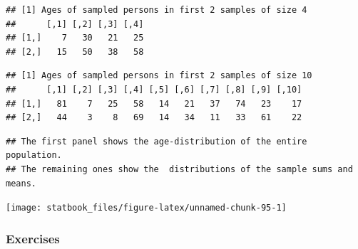 \documentclass[]{book}
\begin{document}
\begin{verbatim}
## [1] Ages of sampled persons in first 2 samples of size 4
##      [,1] [,2] [,3] [,4]
## [1,]    7   30   21   25
## [2,]   15   50   38   58
\end{verbatim}

\begin{verbatim}
## [1] Ages of sampled persons in first 2 samples of size 10
##      [,1] [,2] [,3] [,4] [,5] [,6] [,7] [,8] [,9] [,10]
## [1,]   81    7   25   58   14   21   37   74   23    17
## [2,]   44    3    8   69   14   34   11   33   61    22
\end{verbatim}

\begin{verbatim}
## The first panel shows the age-distribution of the entire population.
## The remaining ones show the  distributions of the sample sums and means.
\end{verbatim}

\begin{center}\texttt{[image: statbook\_files/figure-latex/unnamed-chunk-95-1]} \end{center}

\hypertarget{exercises-5}{%
\subsubsection{Exercises}\label{exercises-5}}
\end{document}
